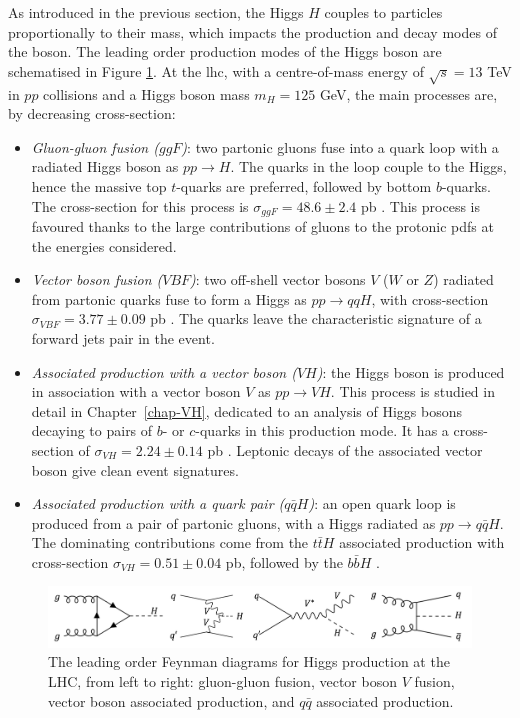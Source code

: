 As introduced in the previous section, the Higgs $H$ couples to particles proportionally to their mass, which impacts the production and decay modes of the boson. The leading order production modes of the Higgs boson are schematised in Figure \ref{fig:prodH}. At the \gls{lhc}, with a centre-of-mass energy of $\sqrt{s} = 13$ TeV in $pp$ collisions and a Higgs boson mass $m_H = 125$ GeV, the main processes are, by decreasing cross-section: 
\begin{itemize}[leftmargin=*]
    \item \textit{Gluon-gluon fusion ($ggF$)}: two partonic gluons fuse into a quark loop with a radiated Higgs boson as $pp \rightarrow H$. The quarks in the loop couple to the Higgs, hence the massive top $t$-quarks are preferred, followed by bottom $b$-quarks. The cross-section for this process is $\sigma_{ggF} = 48.6 \pm 2.4$ pb \cite{LHCHiggsCrossSectionWorkingGroup:2016ypw}. This process is favoured thanks to the large contributions of gluons to the protonic \gls{pdf}s at the energies considered.
    \item \textit{Vector boson fusion ($VBF$)}: two off-shell vector bosons $V$ ($W$ or $Z$) radiated from partonic quarks fuse to form a Higgs as $pp \rightarrow qqH$, with cross-section $\sigma_{VBF} = 3.77 \pm 0.09$ pb \cite{LHCHiggsCrossSectionWorkingGroup:2016ypw}. The quarks leave the characteristic signature of a forward jets pair in the event.
    \item \textit{Associated production with a vector boson ($VH$)}: the Higgs boson is produced in association with a vector boson $V$ as $pp \rightarrow VH$. This process is studied in detail in Chapter~\ref{chap-VH}, dedicated to an analysis of Higgs bosons decaying to pairs of $b$- or $c$-quarks in this production mode. It has a cross-section of $\sigma_{VH} = 2.24 \pm 0.14$ pb \cite{LHCHiggsCrossSectionWorkingGroup:2016ypw}. Leptonic decays of the associated vector boson give clean event signatures.
    \item \textit{Associated production with a quark pair ($q\bar{q}H$)}: an open quark loop is produced from a pair of partonic gluons, with a Higgs radiated as $pp \rightarrow q\bar{q}H$. The dominating contributions come from the $t\bar{t}H$ associated production with cross-section $\sigma_{VH} = 0.51 \pm 0.04$ pb, followed by the $b\bar{b}H$ \cite{LHCHiggsCrossSectionWorkingGroup:2016ypw}.
\end{itemize}

\begin{figure}[h!]
    \center
    \includegraphics[width=\textwidth]{Images/Theory/higgsprod.png}
    \caption{The leading order Feynman diagrams for Higgs production at the LHC, from left to right: gluon-gluon fusion, vector boson $V$ fusion, vector boson associated production, and $q\bar{q}$ associated production.}
    \label{fig:prodH}
\end{figure}


